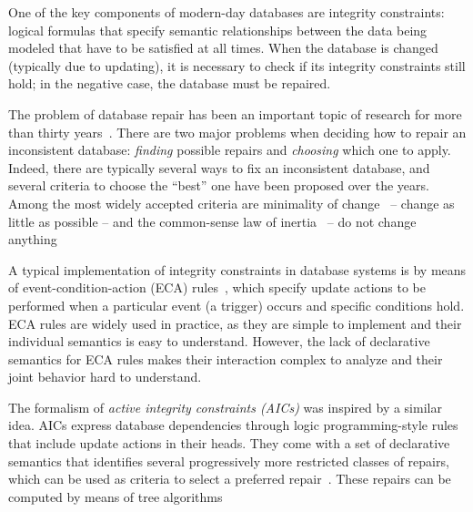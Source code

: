 
One of the key components of modern-day databases are integrity constraints: logical formulas that specify semantic relationships between the data being modeled that have to be satisfied at all times.
When the database is changed (typically due to updating), it is necessary to check if its integrity constraints still hold; in the negative case, the database must be repaired.

The problem of database repair has been an important topic of research for more than thirty years~\cite{icdt/Abiteboul88}.
There are two major problems when deciding how to repair an inconsistent database: \emph{finding} possible repairs and \emph{choosing} which one to apply.
Indeed, there are typically several ways to fix an inconsistent database, and several criteria to choose the ``best'' one have been proposed over the years.
Among the most widely accepted criteria are minimality of change~\cite{Winslett90,ai/EiterG92} -- change as little as possible -- and the common-sense law of inertia~\cite[discussed in, e.g.,][]{jlp/PrzymusinskiT97} -- do not change anything 

A typical implementation of integrity constraints in database systems is by means of event-condition-action (ECA) rules~\cite{vldb/TenienteO95,mk/WidomC96}, which specify update actions to be performed when a particular event (a trigger) occurs and specific conditions hold.
ECA rules are widely used in practice, as they are simple to implement and their individual semantics is easy to understand.
However, the lack of declarative semantics for ECA rules makes their interaction complex to analyze and their joint behavior hard to understand.

The formalism of \emph{active integrity constraints (AICs)} \cite{ppdp/FlescaGZ04} was inspired by a similar idea.
AICs express database dependencies through logic programming-style rules that include update actions in their heads.
They come with a set of declarative semantics that identifies several progressively more restricted classes of repairs, which can be used as criteria to select a preferred repair~\cite{tplp/CaropreseT11}.
These repairs can be computed by means of tree algorithms

